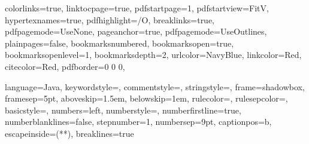 \graphicspath{{figures/}{../figures/}}

\hypersetup %
{
	colorlinks=true,
	linktocpage=true, 
	pdfstartpage=1,
	pdfstartview=FitV,
	hypertexnames=true,
	pdfhighlight=/O,
	breaklinks=true,
	pdfpagemode=UseNone,
	pageanchor=true,
	pdfpagemode=UseOutlines,
	plainpages=false,
	bookmarksnumbered,
	bookmarksopen=true,
	bookmarksopenlevel=1,
	bookmarksdepth=2,
	urlcolor=NavyBlue,
	linkcolor=Red,
	citecolor=Red,
	pdfborder={0 0 0},
}

\lstset %
{
	language=Java,
	keywordstyle=\color{RoyalBlue},
    commentstyle=\color{Green}\ttfamily,
    stringstyle=\color{Red}\ttfamily,
	frame=shadowbox,
	framesep=5pt,
	aboveskip=1.5em,
	belowskip=1em,
	rulecolor=\color{blue!40!black},
	rulesepcolor=\color{white!93!black},
	basicstyle=\ttfamily\normalsize,
	numbers=left,
	numberstyle=\tiny,
	numberfirstline=true,
	numberblanklines=false,
	stepnumber=1,
	numbersep=9pt,	
	captionpos=b,
	escapeinside={(*}{*)},
	breaklines=true
}

\usetikzlibrary{positioning,fit,calc,shapes,arrows,external,petri}

